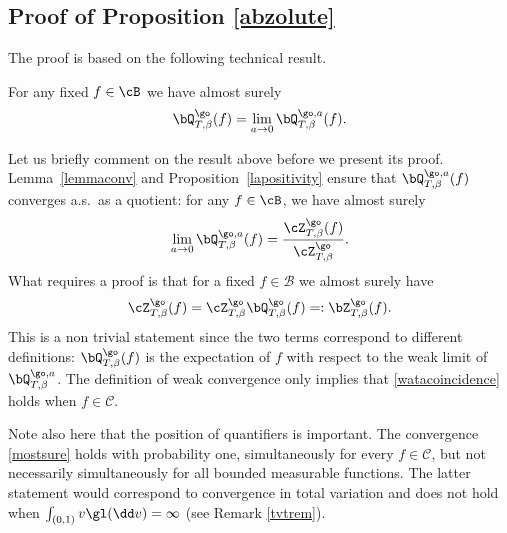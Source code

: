 \subsection{Proof of Proposition \ref{abzolute}}
\label{sec:abzolute}

The proof is based on the following technical result.
\begin{lemma}\label{mostsurelemma}
For any fixed $f\in \cB$ we have almost surely
\begin{equation}\label{mostsure}
\bQ^{\go}_{T,\beta}(f)= \lim_{a\to 0} \bQ^{\go,a}_{T,\beta}(f).
\end{equation}
\end{lemma}
 Let us briefly comment on the result above before we present its proof. Lemma~\ref{lemmaconv} and Proposition~\ref{lapositivity} ensure that $\bQ^{\go,a}_{T,\beta}(f)$ converges a.s.\ as a quotient:
for any $f\in \cB$, we have almost surely
\begin{equation}
\label{convas}
\lim_{a\to 0}\bQ^{\go,a}_{T,\beta}(f)= \frac{\cZ^{\go}_{T,\beta}(f) }{\cZ^{\go}_{T,\beta}}.
\end{equation}
What requires a proof is that for a fixed $f\in \mathcal B$ we almost surely have
\begin{equation}\label{watacoincidence}
\cZ^{\go}_{T,\beta}(f)= \cZ^{\go}_{T,\beta}\bQ^{\go}_{T,\beta}(f)=:{\bZ}^{\go}_{T,\beta}(f).
\end{equation}
This is a non trivial statement since the two terms correspond to different definitions: $\bQ^{\go}_{T,\beta}(f)$ is the expectation of $f$ with respect to the weak limit of $\bQ^{\go,a}_{T,\beta}$.
The definition of weak convergence only implies that \eqref{watacoincidence} holds when $f\in \mathcal C$.

Note also here that the position of quantifiers is important. The convergence \eqref{mostsure} holds with probability one, simultaneously for every $f\in \mathcal C$, but not necessarily simul\-taneously for all bounded measurable functions. The latter statement would correspond to convergence in total variation and does not hold when $\int_{(0,1)}v \gl(\dd v)=\infty$ (see Remark \ref{tvtrem}).


